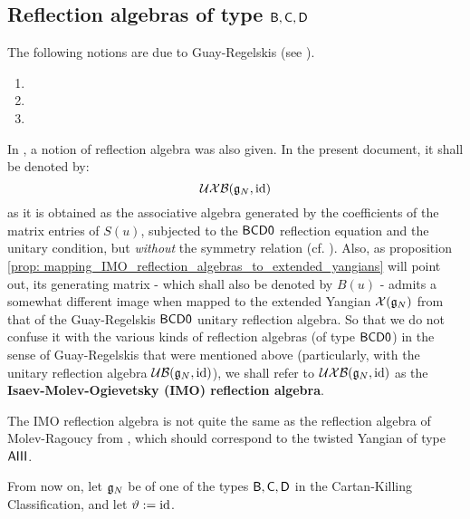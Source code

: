         \subsection{Reflection algebras of type \texorpdfstring{$\mathsf{B}, \mathsf{C}, \mathsf{D}$}{}}
            The following notions are due to Guay-Regelskis (see \cite{guay_regelskis_twisted_yangians_for_symmetric_pairs_of_types_BCD}).
            \begin{definition} \label{def: (extended)_reflection_algebras} 
                \begin{enumerate}
                    \item 
                    \item 
                    \item 
                \end{enumerate}
            \end{definition}
            \begin{convention} \label{conv: IMO_reflection_algebras}
                In \cite{isaev_molev_ogievetsky_fusion_for_brauer_algebras_2}, a notion of reflection algebra was also given. In the present document, it shall be denoted by:
                    $$\mathcal{UXB}(\mathfrak{g}_N, \mathrm{id})$$
                as it is obtained as the associative algebra generated by the coefficients of the matrix entries of $S(u)$, subjected to the $\mathsf{B}\mathsf{C}\mathsf{D}\mathsf{0}$ reflection equation and the unitary condition, but \textit{without} the symmetry relation (cf. \cite[Definition 3.1]{isaev_molev_ogievetsky_fusion_for_brauer_algebras_2}). Also, as proposition \ref{prop: mapping_IMO_reflection_algebras_to_extended_yangians} will point out, its generating matrix - which shall also be denoted by $B(u)$ - admits a somewhat different image when mapped to the extended Yangian $\mathcal{X}(\mathfrak{g}_N)$ from that of the Guay-Regelskis $\mathsf{B}\mathsf{C}\mathsf{D}\mathsf{0}$ unitary reflection algebra. So that we do not confuse it with the various kinds of reflection algebras (of type $\mathsf{B}\mathsf{C}\mathsf{D}\mathsf{0}$) in the sense of Guay-Regelskis that were mentioned above (particularly, with the unitary reflection algebra $\mathcal{UB}(\mathfrak{g}_N, \mathrm{id})$), we shall refer to $\mathcal{UXB}(\mathfrak{g}_N, \mathrm{id})$ as the \textbf{Isaev-Molev-Ogievetsky (IMO) reflection algebra}.
            \end{convention}
            \begin{remark}
                The IMO reflection algebra is not quite the same as the reflection algebra of Molev-Ragoucy from \cite{molev_ragoucy_representations_of_reflection_algebras}, which should correspond to the twisted Yangian of type $\mathsf{A} \mathsf{III}$.
            \end{remark}
            From now on, let $\mathfrak{g}_N$ be of one of the types $\mathsf{B}, \mathsf{C}, \mathsf{D}$ in the Cartan-Killing Classification, and let $\vartheta := \mathrm{id}$.

